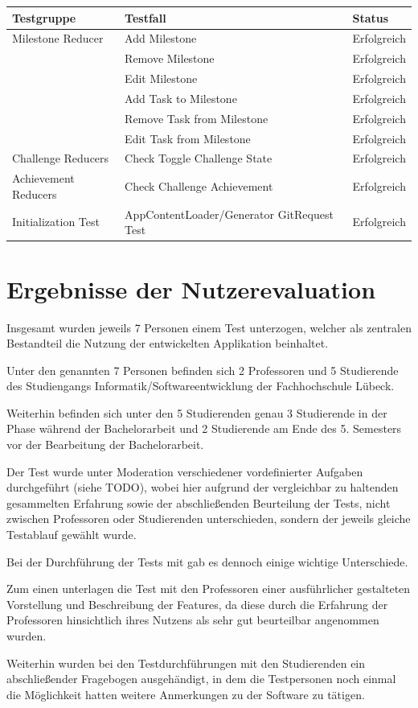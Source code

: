 \documentclass[bibliography=totoc,listof=totoc,BCOR=5mm,DIV=12,oneside]{scrbook}
\begin{document}
\bigskip
\begin{tabularx}{\textwidth}{l|X|l}
	\toprule
	\textbf{Testgruppe} & \textbf{Testfall} & \textbf{Status}\\ 
	\midrule
 	Milestone Reducer & Add Milestone & Erfolgreich \\ 
 	& Remove Milestone & Erfolgreich \\ 
 	& Edit Milestone & Erfolgreich \\
 	& Add Task to Milestone & Erfolgreich \\
 	& Remove Task from Milestone & Erfolgreich \\
 	& Edit Task from Milestone & Erfolgreich \\ 
 	\midrule
 	Challenge Reducers & Check Toggle Challenge State & Erfolgreich \\
 	\midrule
 	Achievement Reducers & Check Challenge Achievement & Erfolgreich \\
 	\midrule
 	Initialization Test & AppContentLoader/Generator GitRequest Test & Erfolgreich
 	\\ 
	\bottomrule
\end{tabularx}
\label{tab:reducertests}

\newpage
\section{Ergebnisse der Nutzerevaluation}
\par Insgesamt wurden jeweils 7 Personen einem Test unterzogen, welcher als zentralen Bestandteil die Nutzung der entwickelten Applikation beinhaltet. 
\par Unter den genannten 7 Personen befinden sich 2 Professoren und 5 Studierende des Studiengangs Informatik/Softwareentwicklung der Fachhochschule Lübeck. 
\par Weiterhin befinden sich unter den 5 Studierenden genau 3 Studierende in der Phase während der Bachelorarbeit und 2 Studierende am Ende des 5. Semesters vor der Bearbeitung der Bachelorarbeit.

\par \bigskip Der Test wurde unter Moderation verschiedener vordefinierter Aufgaben durchgeführt (siehe TODO), wobei hier aufgrund der vergleichbar zu haltenden gesammelten Erfahrung sowie der abschließenden Beurteilung der Tests, nicht zwischen Professoren oder Studierenden unterschieden, sondern der jeweils gleiche Testablauf gewählt wurde.
\par \bigskip Bei der Durchführung der Tests mit gab es dennoch einige wichtige Unterschiede. 
\par Zum einen unterlagen die Test mit den Professoren einer ausführlicher gestalteten Vorstellung und Beschreibung der Features, da diese durch die Erfahrung der Professoren hinsichtlich ihres Nutzens als sehr gut beurteilbar angenommen wurden.
\par Weiterhin wurden bei den Testdurchführungen mit den Studierenden ein abschließender Fragebogen ausgehändigt, in dem die Testpersonen noch einmal die Möglichkeit hatten weitere Anmerkungen zu der Software zu tätigen.
\end{document}
